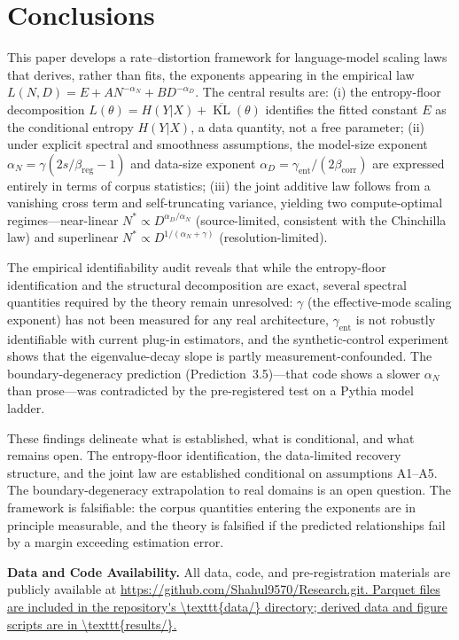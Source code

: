 \documentclass[entropy,article,submit,moreauthors,pdftex]{mdpi}
\newcommand{\KL}{\operatorname{KL}}
\begin{document}
\section{Conclusions}
\label{sec:conclusions}

This paper develops a rate--distortion framework for language-model scaling laws that derives, rather than fits, the exponents appearing in the empirical law $L(N,D) = E + A N^{-\alpha_N} + B D^{-\alpha_D}$. The central results are: (i) the entropy-floor decomposition $L(\theta) = H(Y|X) + \overline{\KL}(\theta)$ identifies the fitted constant $E$ as the conditional entropy $H(Y|X)$, a data quantity, not a free parameter; (ii) under explicit spectral and smoothness assumptions, the model-size exponent $\alpha_N = \gamma(2s/\beta_{\mathrm{reg}}-1)$ and data-size exponent $\alpha_D = \gamma_{\mathrm{ent}}/(2\beta_{\mathrm{corr}})$ are expressed entirely in terms of corpus statistics; (iii) the joint additive law follows from a vanishing cross term and self-truncating variance, yielding two compute-optimal regimes---near-linear $N^*\propto D^{\alpha_D/\alpha_N}$ (source-limited, consistent with the Chinchilla law) and superlinear $N^*\propto D^{1/(\alpha_N+\gamma)}$ (resolution-limited).

The empirical identifiability audit reveals that while the entropy-floor identification and the structural decomposition are exact, several spectral quantities required by the theory remain unresolved: $\gamma$ (the effective-mode scaling exponent) has not been measured for any real architecture, $\gamma_{\mathrm{ent}}$ is not robustly identifiable with current plug-in estimators, and the synthetic-control experiment shows that the eigenvalue-decay slope is partly measurement-confounded. The boundary-degeneracy prediction (Prediction~3.5)---that code shows a slower $\alpha_N$ than prose---was contradicted by the pre-registered test on a Pythia model ladder.

These findings delineate what is established, what is conditional, and what remains open. The entropy-floor identification, the data-limited recovery structure, and the joint law are established conditional on assumptions A1--A5. The boundary-degeneracy extrapolation to real domains is an open question. The framework is falsifiable: the corpus quantities entering the exponents are in principle measurable, and the theory is falsified if the predicted relationships fail by a margin exceeding estimation error.


\noindent\textbf{Data and Code Availability.} All data, code, and pre-registration materials are publicly available at \url{https://github.com/Shahul9570/Research.git. Parquet files are included in the repository's \texttt{data/} directory; derived data and figure scripts are in \texttt{results/}.}
\end{document}
